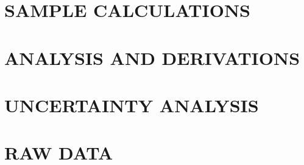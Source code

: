 \documentclass[12pt]{article}
\begin{document}
\clearpage
\begin{alphasection}
    \section{SAMPLE CALCULATIONS}\label{sec:A}
    
    
    \section{ANALYSIS AND DERIVATIONS}\label{sec:B}
    
    
    \section{UNCERTAINTY ANALYSIS}\label{sec:C}
    
    
    \section{RAW DATA} \label{sec:D}
    
    
\end{alphasection}











\end{document}
